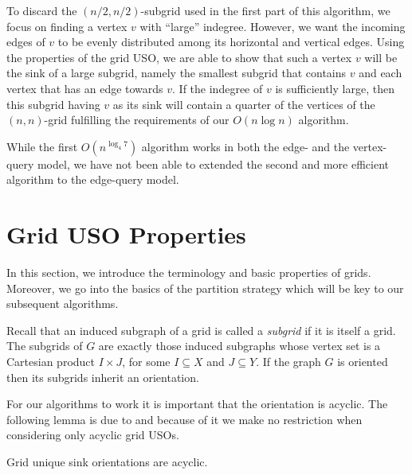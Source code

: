 \documentclass[runningheads,a4paper]{llncs}
\newcommand{\JN}[1]{\marginpar{\parbox{3.6cm}{{\small {\bf JN:} #1}}}} %
\begin{document}
To discard the $(n/2, n/2)$-subgrid used in the first part of this algorithm, we focus on finding a vertex $v$ with ``large'' indegree. 
However, we want the incoming edges of $v$ to be evenly distributed among its horizontal and vertical edges. Using the properties of the grid USO, we are able to show that such a vertex $v$ will be the sink of a large subgrid, namely the smallest subgrid that contains $v$ and each vertex that has an edge towards $v$.
If the indegree of $v$ is sufficiently large, then this subgrid having $v$ as its sink will contain a quarter of the vertices of the $(n,n)$-grid fulfilling the requirements of our $O(n \log n)$ algorithm.

While the first $O(n^{\log_4 7})$ algorithm works in both the edge- and the vertex-query model, we have not been able to extended the second and more efficient algorithm to the edge-query model.


\section{Grid USO Properties}\label{section:grid_uso_properties}
In this section, we introduce the terminology and basic properties of grids. Moreover, we go into the basics of the partition strategy which will be key to our subsequent algorithms.


Recall that an induced subgraph of a grid is called a \emph{subgrid} if it is itself a grid.
The subgrids of $G$ are exactly those induced subgraphs whose vertex set is a
Cartesian product $I \times J$, for some $I \subseteq X$ and $J \subseteq Y$.
If the graph $G$ is oriented then its subgrids inherit an orientation.

For our algorithms to work it is important that the orientation is acyclic. The following lemma is due to \citet{grid08} and because of it we make no restriction when considering only acyclic grid USOs. 

\begin{lemma}
\label{lemma:acyclicity_lemma}
 Grid unique sink orientations are acyclic.
\end{lemma}
\end{document}
